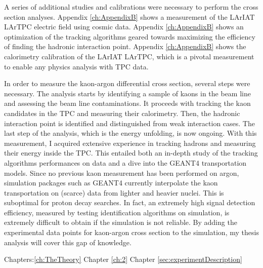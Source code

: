 A series of additional studies and calibrations were necessary to perform the cross section analyses. Appendix \ref{ch:AppendixB} shows a measurement of the LArIAT LArTPC electric field using cosmic data. Appendix \ref{ch:AppendixB} shows an optimization of the tracking algorithms geared towards maximizing the efficiency of finding the hadronic interaction point. Appendix \ref{ch:AppendixB} shows the calorimetry calibration of the LArIAT LArTPC, which is a pivotal measurement to enable any physics analysis with TPC data.  











In order to measure the kaon-argon differential cross section, several steps were necessary. The analysis starts by identifying a sample of kaons in the beam line and assessing the beam line contaminations. It proceeds with tracking the kaon candidates in the TPC and measuring their calorimetry.  Then,  the hadronic interaction point is identified and distinguished from weak interaction cases. The last step of the analysis, which is the energy unfolding, is now ongoing. 
With  this measurement, I acquired extensive experience in tracking hadrons and measuring their energy inside the TPC. This entailed both an in-depth study of the tracking algorithms performances on data and a dive into the GEANT4 transportation models. Since no previous kaon measurement has been performed on argon, simulation packages such as GEANT4 currently interpolate the kaon transportation on (scarce) data from lighter and heavier nuclei. This is suboptimal for proton decay searches.  In fact, an extremely high signal detection efficiency, measured by testing identification algorithms on simulation, is extremely difficult to obtain if the simulation is not reliable. By adding the experimental data points for kaon-argon cross section to the simulation, my thesis analysis will cover this gap of knowledge.



Chapters:\ref{ch:TheTheory}
Chapter \ref{ch:2}
Chapter \ref{sec:experimentDescription}

